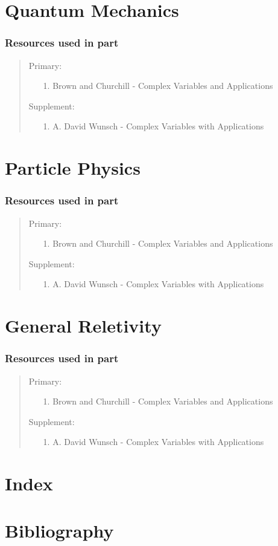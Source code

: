 \documentclass[12pt, english]{book}
\newenvironment{partintro}
{\vspace*{\fill}
	\section*{\centering Resources used in part \thepart}
	\begin{quotation}}
	{\end{quotation}\vspace*{\fill}\newpage}
\begin{document}
	\part{Quantum Mechanics} \label{Quantum Mechanics Part}
	\begin{partintro}
		\noindent Primary:
		\begin{itemize}
			\item[1.] Brown and Churchill - Complex Variables and Applications
		\end{itemize}
		Supplement: 
		\begin{itemize}
			\item[1.] A. David Wunsch - Complex Variables with Applications
		\end{itemize}
	\end{partintro}

	\part{Particle Physics} \label{Particle Physics Part}
	\begin{partintro}
		\noindent Primary:
		\begin{itemize}
			\item[1.] Brown and Churchill - Complex Variables and Applications
		\end{itemize}
		Supplement: 
		\begin{itemize}
			\item[1.] A. David Wunsch - Complex Variables with Applications
		\end{itemize}
	\end{partintro}

	\part{General Reletivity} \label{General Reletivity Part}
	\begin{partintro}
		\noindent Primary:
		\begin{itemize}
			\item[1.] Brown and Churchill - Complex Variables and Applications
		\end{itemize}
		Supplement: 
		\begin{itemize}
			\item[1.] A. David Wunsch - Complex Variables with Applications
		\end{itemize}
	\end{partintro}
	
	
	
	\backmatter
	\part{Index} \label{Index Part}
	
	\part{Bibliography}
	
	\typeout{}
	
	
\end{document}
